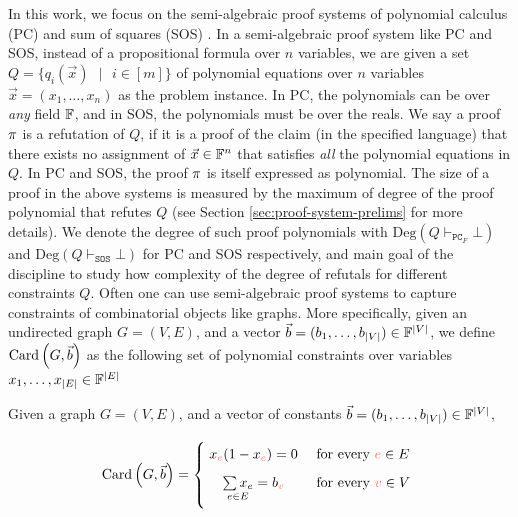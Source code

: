 \documentclass[11pt]{article}
\newcommand{\Degree}[1]{\text{Deg}\left(#1\right)}
\newcommand{\PC}{\vdash_{\texttt{PC}_F}}
\newcommand{\SOS}{\vdash_{\texttt{SOS}}}
\begin{document}
In this work, we focus on the semi-algebraic proof systems of polynomial calculus (PC) \citep{alekhnovich2004pseudorandom} and sum of squares (SOS) \citep{parrilo2000structured, boazCourse}.
In a semi-algebraic proof system like PC and SOS, instead of a propositional formula over $n$ variables, we are given a set $Q=\{q_i(\vec{x}) \text{ } |\text{ } i \in [m] \}$ of polynomial equations over $n$ variables $\vec{x} = (x_1, \dots, x_n)$ as the problem instance.
In PC, the polynomials can be over \emph{any} field $\mathbb{F}$, and in SOS, the polynomials must be over the reals.
We say a proof $\pi$ is a refutation of $Q$, if it is a proof of the claim (in the specified language) that there exists no assignment of $\vec{x} \in \mathbb{F}^n$ that satisfies \emph{all} the polynomial equations in $Q$. 
In PC and SOS, the proof $\pi$ is itself expressed as polynomial.  
The size of a proof in the above systems is measured by the maximum of degree of the proof polynomial that refutes $Q$ (see Section \ref{sec:proof-system-prelims} for more details).
We denote the degree of such proof polynomials with $\Degree{Q \PC \bot}$ and $\Degree{Q \SOS \bot}$ for PC and SOS respectively, and  main goal of the discipline to study how complexity of the degree of refutals for different constraints $Q$.
Often one can use semi-algebraic proof systems to capture constraints of combinatorial objects like graphs.
More specifically, given an undirected graph $G=(V,E)$, and a vector $\vec{b} = (b_1, \dots, b_{|V|})  \in \mathbb{F}^{\left|V\right|}$, we define $\text{Card}\left(G, \vec{b}\right)$ as the following set of polynomial constraints over variables $x_1, \dots, x_{|E|} \in \mathbb{F}^{\left|E\right|}$

\begin{definition}[Card]\label{def:card}Given a graph $G=(V,E)$, and a vector of constants $\vec{b} = (b_1, \dots, b_{|V|}) \in \mathbb{F}^{|V|}$,

\begin{displaymath}
        \Card{G, \vec{b}}=
        \Bigger[10]\{\begin{array}{@{}cl}
                x_{\highlight{e}}(1 - x_{\highlight{e}}) = 0 & \text{ for every $\highlight{e} \in E$}\\[3mm]
                \underset{e \in E}{\sum x_e}= b_{\highlight{v}} & \text{ for every $\highlight{v} \in V$} \\[3mm]
        \end{array}
\end{displaymath}
	
\end{definition}
\end{document}
